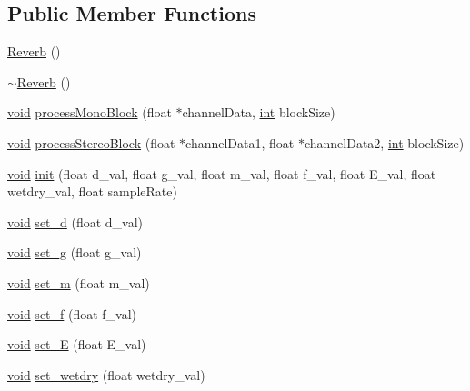 \subsection*{Public Member Functions}
\begin{DoxyCompactItemize}
\item 
\hyperlink{class_audealize_1_1_reverb_a6bb1409a11f960eafff156ab2a6f60a3}{Reverb} ()
\item 
\hyperlink{class_audealize_1_1_reverb_a53286010677ee1e5a2a81e3ea9688c1c}{$\sim$\+Reverb} ()
\item 
\hyperlink{tk_8h_aba408b7cd755a96426e004c015f5de8e}{void} \hyperlink{class_audealize_1_1_reverb_a6e6224a37e50c83e7dbe2f3c9c1814d8}{process\+Mono\+Block} (float $\ast$channel\+Data, \hyperlink{tk_8h_a83f82f76e7fed06f4c49d2db94028a6d}{int} block\+Size)
\item 
\hyperlink{tk_8h_aba408b7cd755a96426e004c015f5de8e}{void} \hyperlink{class_audealize_1_1_reverb_a9351a471cd711bfa2a347bdca084d397}{process\+Stereo\+Block} (float $\ast$channel\+Data1, float $\ast$channel\+Data2, \hyperlink{tk_8h_a83f82f76e7fed06f4c49d2db94028a6d}{int} block\+Size)
\item 
\hyperlink{tk_8h_aba408b7cd755a96426e004c015f5de8e}{void} \hyperlink{class_audealize_1_1_reverb_a301a030f103e237741614e22498834ff}{init} (float d\+\_\+val, float g\+\_\+val, float m\+\_\+val, float f\+\_\+val, float E\+\_\+val, float wetdry\+\_\+val, float sample\+Rate)
\item 
\hyperlink{tk_8h_aba408b7cd755a96426e004c015f5de8e}{void} \hyperlink{class_audealize_1_1_reverb_a8b4944f1ed31c1226f52fe91e44f6472}{set\+\_\+d} (float d\+\_\+val)
\item 
\hyperlink{tk_8h_aba408b7cd755a96426e004c015f5de8e}{void} \hyperlink{class_audealize_1_1_reverb_ae60ddead2f69f41bab5d89f2dc70916c}{set\+\_\+g} (float g\+\_\+val)
\item 
\hyperlink{tk_8h_aba408b7cd755a96426e004c015f5de8e}{void} \hyperlink{class_audealize_1_1_reverb_a7e8039fe4f4a71c4c46fa74ae76e15f7}{set\+\_\+m} (float m\+\_\+val)
\item 
\hyperlink{tk_8h_aba408b7cd755a96426e004c015f5de8e}{void} \hyperlink{class_audealize_1_1_reverb_a1dd995a1df58a6db8df8213cef896158}{set\+\_\+f} (float f\+\_\+val)
\item 
\hyperlink{tk_8h_aba408b7cd755a96426e004c015f5de8e}{void} \hyperlink{class_audealize_1_1_reverb_a81166e0d284f3266f1a5a646e78abe42}{set\+\_\+E} (float E\+\_\+val)
\item 
\hyperlink{tk_8h_aba408b7cd755a96426e004c015f5de8e}{void} \hyperlink{class_audealize_1_1_reverb_a95bffc24800591faf3458cf489c3bcae}{set\+\_\+wetdry} (float wetdry\+\_\+val)

\end{DoxyCompactItemize}
